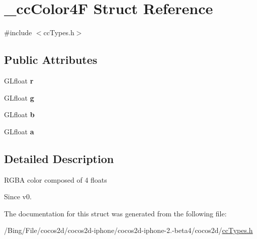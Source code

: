\hypertarget{struct__cc_color4_f}{\section{\-\_\-cc\-Color4\-F Struct Reference}
\label{struct__cc_color4_f}
}


{\ttfamily \#include $<$cc\-Types.\-h$>$}

\subsection*{Public Attributes}
\begin{DoxyCompactItemize}
\item 
\hypertarget{struct__cc_color4_f_a5de3aa7ad1663a8ec2475afe19b4ab3d}{G\-Lfloat {\bfseries r}}\label{struct__cc_color4_f_a5de3aa7ad1663a8ec2475afe19b4ab3d}

\item 
\hypertarget{struct__cc_color4_f_a6c6a1f945462e41b82ef75cb7f8d9c08}{G\-Lfloat {\bfseries g}}\label{struct__cc_color4_f_a6c6a1f945462e41b82ef75cb7f8d9c08}

\item 
\hypertarget{struct__cc_color4_f_a9ea1fc40f98fce7e6a02af1eddda70d5}{G\-Lfloat {\bfseries b}}\label{struct__cc_color4_f_a9ea1fc40f98fce7e6a02af1eddda70d5}

\item 
\hypertarget{struct__cc_color4_f_acdcbdf3965687c19a25403990e4513be}{G\-Lfloat {\bfseries a}}\label{struct__cc_color4_f_acdcbdf3965687c19a25403990e4513be}

\end{DoxyCompactItemize}


\subsection{Detailed Description}
R\-G\-B\-A color composed of 4 floats \begin{DoxySince}{Since}
v0. 
\end{DoxySince}


The documentation for this struct was generated from the following file\-:\begin{DoxyCompactItemize}
\item 
/\-Bing/\-File/cocos2d/cocos2d-\/iphone/cocos2d-\/iphone-\/2.-\/beta4/cocos2d/\hyperlink{cc_types_8h}{cc\-Types.\-h}\end{DoxyCompactItemize}
